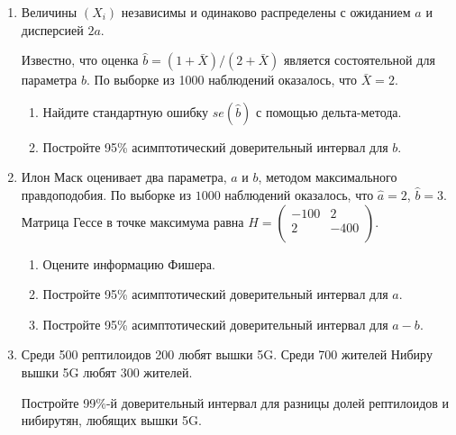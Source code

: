 \documentclass[12pt]{article}
\begin{document}
\begin{enumerate}
\item Величины $(X_i)$ независимы и одинаково распределены с ожиданием $a$ и дисперсией $2a$.

Известно, что оценка $\hat b = (1 + \bar X)/(2 + \bar X)$ является состоятельной для параметра $b$. 
По выборке из 1000 наблюдений оказалось, что $\bar X = 2$.

\begin{enumerate}
    \item Найдите стандартную ошибку $se(\hat b)$ с помощью дельта-метода.
    \item Постройте 95\% асимптотический доверительный интервал для $b$.
\end{enumerate}

\item Илон Маск оценивает два параметра, $a$ и $b$, методом максимального правдоподобия. 
По выборке из $1000$ наблюдений оказалось, что $\hat a = 2$, $\hat b = 3$.
Матрица Гессе в точке максимума равна $H = \begin{pmatrix}
    -100 & 2 \\
    2 & -400 \\
\end{pmatrix}$.
\begin{enumerate}
    \item Оцените информацию Фишера. 
    \item Постройте 95\% асимптотический доверительный интервал для $a$.
    \item Постройте 95\% асимптотический доверительный интервал для $a - b$.
\end{enumerate}

\item Среди 500 рептилоидов 200 любят вышки 5G. 
Среди 700 жителей Нибиру вышки 5G любят 300 жителей. 

Постройте 99\%-й доверительный интервал для разницы долей рептилоидов и нибирутян, любящих вышки 5G.


\end{enumerate}
\end{document}
